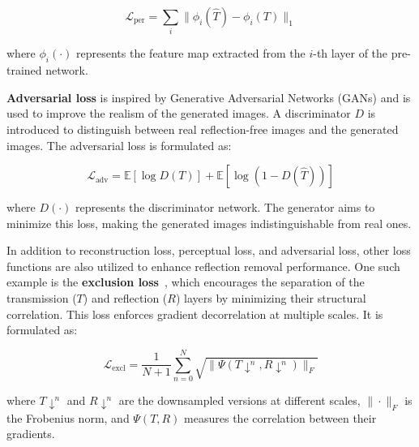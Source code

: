 \begin{equation}
    \mathcal{L}_{\text{per}} = \sum_{i} \| \phi_i(\hat{T}) - \phi_i(T) \|_1
\end{equation}

where \( \phi_i(\cdot) \) represents the feature map extracted from the \( i \)-th layer of the pre-trained network.


\textbf{Adversarial loss} is inspired by Generative Adversarial Networks (GANs) and is used to improve the realism of the generated images. A discriminator \( D \) is introduced to distinguish between real reflection-free images and the generated images. The adversarial loss is formulated as:

\begin{equation}
    \mathcal{L}_{\text{adv}} = \mathbb{E}[\log D(T)] + \mathbb{E}[\log (1 - D(\hat{T}))]
\end{equation}

where \( D(\cdot) \) represents the discriminator network. The generator aims to minimize this loss, making the generated images indistinguishable from real ones.



In addition to reconstruction loss, perceptual loss, and adversarial loss, other loss functions are also utilized to enhance reflection removal performance. One such example is the \textbf{exclusion loss}~\cite{li2023two,zhang2018single}, which encourages the separation of the transmission (\(T\)) and reflection (\(R\)) layers by minimizing their structural correlation. This loss enforces gradient decorrelation at multiple scales. It is formulated as:


\begin{equation}
    \mathcal{L}_{\text{excl}} = \frac{1}{N+1} \sum_{n=0}^{N} \sqrt{\|\Psi(T\downarrow^n, R\downarrow^n)\|_F}
\end{equation}

where \(T\downarrow^n\) and \(R\downarrow^n\) are the downsampled versions at different scales, $\|\cdot\|_F$ is the Frobenius norm, and $\Psi(T, R)$ measures the correlation between their gradients.



